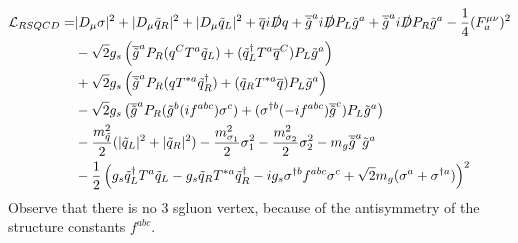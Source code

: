 \begin{align}
\mathcal{L}_{RSQCD} = & |D_\mu \sigma|^2 + |D_\mu \tilde{q}_R|^2 + |D_\mu \tilde{q}_L|^2 + \overline{q}i\slashed{D}q + \overline{\tilde{g}}^ai\slashed{D}P_L\tilde{g}^a + \overline{\tilde{g}}^ai\slashed{D}P_R\tilde{g}^a - \frac{1}{4} (F_a^{\mu\nu})^2\nonumber\\
& -\sqrt{2}g_s \left( \overline{\tilde{g}}^a P_R (q^C T^a \tilde{q}_L) + (\tilde{q}_L^\dagger T^a \overline{q}^C)P_L\tilde{g}^a \right)\nonumber\\
& +\sqrt{2}g_s \left( \overline{\tilde{g}}^a P_R (q T^{\ast a} \tilde{q}_R^\dagger) + (\tilde{q}_R T^{\ast a} \overline{q})P_L\tilde{g}^a \right) \nonumber\\
& -\sqrt{2}g_s \left( \overline{\tilde{g}}^a P_R (\tilde{g}^b (if^{abc}) \sigma^c) + (\sigma^{\dagger b} (-if^{abc}) \overline{\tilde{g}}^c)P_L\tilde{g}^a \right) \nonumber\\
& -\frac{m_{\tilde{q}}^2}{2}(|\tilde{q}_L|^2 + |\tilde{q}_R|^2) -\frac{m_{\sigma_1}^2}{2}\sigma_1^2 -\frac{m_{\sigma_2}^2}{2}\sigma_2^2 -m_g \overline{\tilde{g}}^a\tilde{g}^a\nonumber\\
& -\frac{1}{2}\left( g_s \tilde{q}_L^\dagger T^a \tilde{q}_L - g_s \tilde{q}_R T^{\ast a} \tilde{q}_R^\dagger - ig_s\sigma^{\dagger b}f^{abc}\sigma^c + \sqrt{2}m_g(\sigma^a + \sigma^{\dagger a}) \right)^2\label{eq:L_RSQCD}
\end{align}
Observe that there is no 3 sgluon vertex, because of the antisymmetry of the structure constants $f^{abc}$.
\newpage
